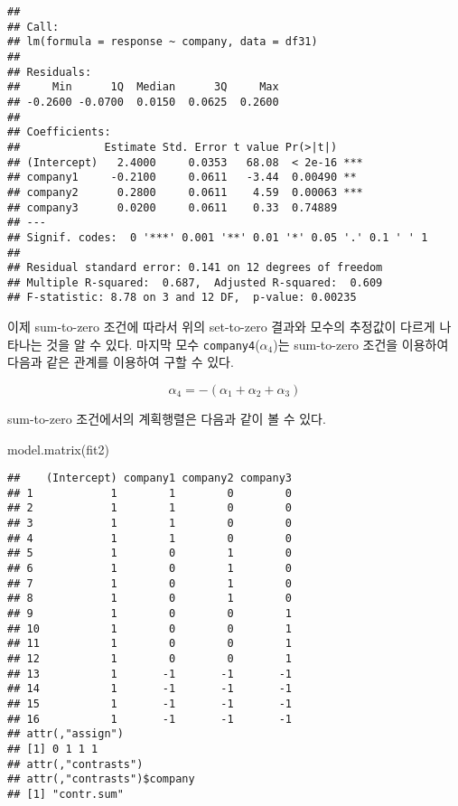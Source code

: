 \documentclass[
]{book}
\newenvironment{Shaded}{\begin{snugshade}}{\end{snugshade}}
\newcommand{\FunctionTok}[1]{\textcolor[rgb]{0.00,0.00,0.00}{#1}}
\newcommand{\NormalTok}[1]{#1}
\begin{document}
\begin{verbatim}
## 
## Call:
## lm(formula = response ~ company, data = df31)
## 
## Residuals:
##     Min      1Q  Median      3Q     Max 
## -0.2600 -0.0700  0.0150  0.0625  0.2600 
## 
## Coefficients:
##             Estimate Std. Error t value Pr(>|t|)    
## (Intercept)   2.4000     0.0353   68.08  < 2e-16 ***
## company1     -0.2100     0.0611   -3.44  0.00490 ** 
## company2      0.2800     0.0611    4.59  0.00063 ***
## company3      0.0200     0.0611    0.33  0.74889    
## ---
## Signif. codes:  0 '***' 0.001 '**' 0.01 '*' 0.05 '.' 0.1 ' ' 1
## 
## Residual standard error: 0.141 on 12 degrees of freedom
## Multiple R-squared:  0.687,  Adjusted R-squared:  0.609 
## F-statistic: 8.78 on 3 and 12 DF,  p-value: 0.00235
\end{verbatim}

이제 sum-to-zero 조건에 따라서 위의 set-to-zero 결과와 모수의 추정값이
다르게 나타나는 것을 알 수 있다. 마지막 모수 \texttt{company4}(\(\alpha_4\))는
sum-to-zero 조건을 이용하여 다음과 같은 관계를 이용하여 구할 수 있다.

\[  \alpha_4 = -(\alpha_1 + \alpha_2 + \alpha_3) \]

sum-to-zero 조건에서의 계획행렬은 다음과 같이 볼 수 있다.

\begin{Shaded}
\begin{Highlighting}[]
\FunctionTok{model.matrix}\NormalTok{(fit2)}
\end{Highlighting}
\end{Shaded}

\begin{verbatim}
##    (Intercept) company1 company2 company3
## 1            1        1        0        0
## 2            1        1        0        0
## 3            1        1        0        0
## 4            1        1        0        0
## 5            1        0        1        0
## 6            1        0        1        0
## 7            1        0        1        0
## 8            1        0        1        0
## 9            1        0        0        1
## 10           1        0        0        1
## 11           1        0        0        1
## 12           1        0        0        1
## 13           1       -1       -1       -1
## 14           1       -1       -1       -1
## 15           1       -1       -1       -1
## 16           1       -1       -1       -1
## attr(,"assign")
## [1] 0 1 1 1
## attr(,"contrasts")
## attr(,"contrasts")$company
## [1] "contr.sum"
\end{verbatim}
\end{document}

